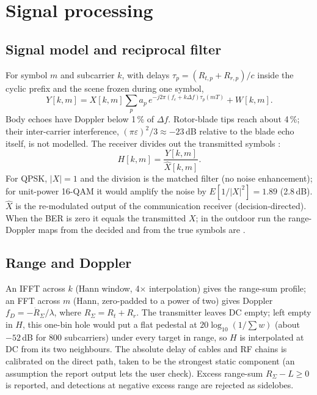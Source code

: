 \documentclass[10pt,a4paper]{article}
\begin{document}
\section{Signal processing}
\subsection{Signal model and reciprocal filter}
For symbol $m$ and subcarrier $k$, with delays $\tau_p=(R_{t,p}+R_{r,p})/c$ inside the cyclic prefix and the scene
frozen during one symbol,
\begin{equation}
Y[k,m] = X[k,m]\sum_p a_p\,e^{-j2\pi (f_c+k\Delta f)\tau_p(mT)} + W[k,m].
\end{equation}
Body echoes have Doppler below 1\,\% of $\Delta f$. Rotor-blade tips reach about 4\,\%; their inter-carrier
interference, $(\pi\varepsilon)^2/3\approx-23$\,dB relative to the blade echo itself, is not modelled. The
receiver divides out the transmitted symbols \cite{sturm2011}:
\begin{equation}
H[k,m]=\frac{Y[k,m]}{\hat X[k,m]}.
\end{equation}
For QPSK, $|X|=1$ and the division is the matched filter (no noise enhancement); for unit-power 16-QAM it would
amplify the noise by $E[1/|X|^2]=1.89$ (2.8\,dB). $\hat X$ is the re-modulated output of the communication
receiver (decision-directed). When the BER is zero it equals the transmitted $X$; in the outdoor run the range-Doppler
maps from the decided and from the true symbols are \GenieSame.

\subsection{Range and Doppler}
An IFFT across $k$ (Hann window, 4$\times$ interpolation) gives the range-sum profile; an FFT across $m$ (Hann,
zero-padded to a power of two) gives Doppler $f_D=-\dot R_\Sigma/\lambda$, where $R_\Sigma=R_t+R_r$. The
transmitter leaves DC empty; left empty in $H$, this one-bin hole would put a flat pedestal at
$20\log_{10}(1/\sum w)$ (about $-52$\,dB for 800 subcarriers) under every target in range, so $H$ is interpolated
at DC from its two neighbours. The absolute delay of cables and RF chains is calibrated on the direct path,
taken to be the strongest static component (an assumption the report output lets the user check). Excess
range-sum $R_\Sigma-L\ge0$ is reported, and detections at negative excess range are rejected as sidelobes.
\end{document}
